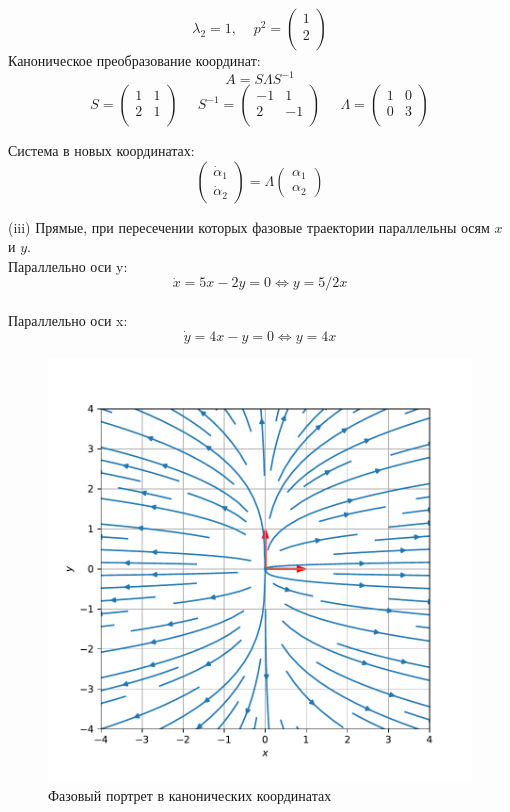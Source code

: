 \documentclass[a4paper, 12pt]{article}
\begin{document}
\[\lambda_2=1,\;\;\;\; p^2=
\left(
\begin{array}{cc}
1\\
2\\
\end{array}
\right)
\]
Каноническое преобразование координат:
\[A = S\Lambda S^{-1}\]
\[
S = \left(
\begin{array}{cc}
1 & 1\\
2 & 1\\
\end{array}
\right)\;\;\;\;\;
S^{-1} = \left(
\begin{array}{cc}
-1 & 1\\
2 & -1\\
\end{array}\right)\;\;\;\;\;
\Lambda = \left(
\begin{array}{cc}
1 & 0\\
0 & 3\\
\end{array}\right)
\]

Система в новых координатах:
\[\left(
\begin{array}{c}
\dot{\alpha}_1\\
\dot{\alpha}_2
\end{array}
\right)=\Lambda\left(
\begin{array}{c}
{\alpha}_1 \\
{\alpha}_2
\end{array}
\right)\]


(iii) Прямые, при пересечении которых фазовые траектории параллельны осям $x$ и $y$.\\
Параллельно оси y:
\[\dot{x} = 5x-2y=0\Leftrightarrow y = 5/2x\]\\
Параллельно оси x:
\[\dot{y} = 4x-y=0\Leftrightarrow y = 4x\]
\begin{figure}[H]
	\centering
	\includegraphics[scale=0.55]{1a1_0}
	\caption{Фазовый портрет в канонических координатах}
	\label{im:1a1_0}
\end{figure}
\end{document}
